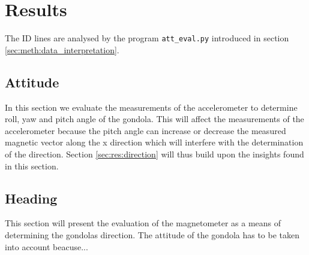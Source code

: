 \chapter{Results \label{ch:results}}
The ID lines are analysed by the program \verb|att_eval.py| introduced in section \ref{sec:meth:data_interpretation}.

\section{Attitude \label{sec:res:attitude}}
In this section we evaluate the measurements of the accelerometer to determine roll, yaw and pitch angle of the gondola. This will affect the measurements of the accelerometer because the pitch angle can increase or decrease the measured magnetic vector along the x direction which will interfere with the determination of the direction. Section \ref{sec:res:direction} will thus build upon the insights found in this section. 

\section{Heading \label{sec:res:heading}}
This section will present the evaluation of the magnetometer as a means of determining the gondolas direction. The attitude of the gondola has to be taken into account beacuse...